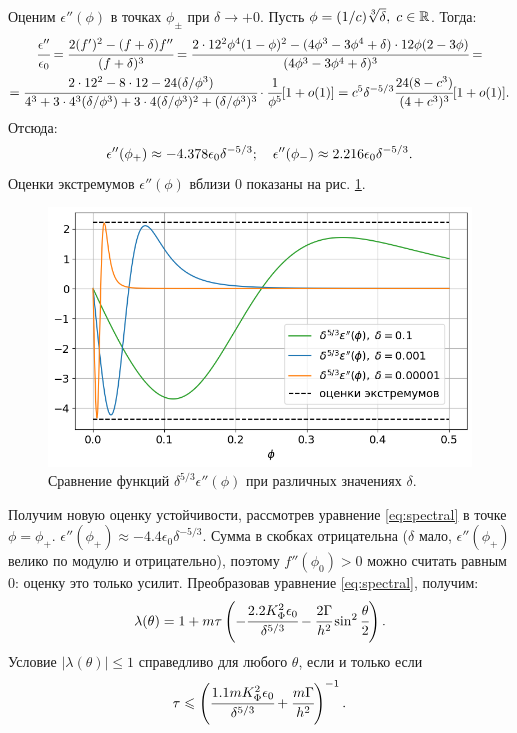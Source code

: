 Оценим $\epsilon''(\phi)$ в точках $\phi_{\pm}$ при $\delta \to +0$. Пусть $\phi = (1/c) \sqrt[3]{\delta}, \; c \in {\mathbb{R}}$. Тогда:
\begin{multline*}
    \cfrac{\epsilon''}{\epsilon_0} = \cfrac{2(f')^2 - (f + \delta)f''}{(f + \delta)^3} = \cfrac{2 \cdot 12^2 \phi^4 (1 - \phi)^2 - (4 \phi^3 - 3 \phi^4 + \delta) \cdot 12 \phi (2 - 3 \phi)}{(4 \phi^3 - 3 \phi^4 + \delta)^3} = \\ = \cfrac{2 \cdot 12^2 - 8 \cdot 12 - 24 (\delta/\phi^3)}{4^3 + 3 \cdot 4^3 (\delta/\phi^3) + 3 \cdot 4 (\delta/\phi^3)^2 + (\delta/\phi^3)^3} \cdot \cfrac{1}{\phi^5}[1 + o(1)] = c^5 \delta^{-5/3} \cfrac{24(8 - c^3)}{(4 + c^3)^3}[1 + o(1)] {\text{.}}
\end{multline*}
Отсюда:
\begin{equation}
    \epsilon''(\phi_+) \approx -4.378 \epsilon_0 \delta^{-5/3}; \quad \epsilon''(\phi_-) \approx 2.216 \epsilon_0 \delta^{-5/3} {\text{.}}
    \label{est:epsilon_phi_phi_bounds}
\end{equation}
Оценки экстремумов $\epsilon''(\phi)$ вблизи $0$ показаны на рис. \ref{fig:eps_phi_phi_multiplied}.

\begin{figure}[!tp]
    \centering
    \includegraphics[width=\textwidth]{figures/eps_phi_phi_multiplied.png}
    \caption{Сравнение функций $\delta^{5/3} \epsilon''(\phi)$ при различных значениях $\delta$.}
    \label{fig:eps_phi_phi_multiplied}
\end{figure}

Получим новую оценку устойчивости, рассмотрев уравнение \eqref{eq:spectral} в точке $\phi = \phi_+$. $\epsilon''(\phi_+) \approx -4.4 \epsilon_0 \delta^{-5/3}$. Сумма в скобках отрицательна ($\delta$ мало, $\epsilon''(\phi_+)$ велико по модулю и отрицательно), поэтому $f''(\phi_0) > 0$ можно считать равным $0$: оценку это только усилит. Преобразовав уравнение \eqref{eq:spectral}, получим:
$$\lambda(\theta) = 1 + m \tau \left( -\cfrac{2.2 K_\Phi^2 \epsilon_0}{\delta^{5/3}} - \cfrac{2 \Gamma}{h^2} \sin^2 \cfrac{\theta}{2} \right) {\text{.}}$$
Условие $|\lambda(\theta)| \leqslant 1$ справедливо для любого $\theta$, если и только если
\begin{equation}
    \tau \leqslant \left( \cfrac{1.1 m K_\Phi^2 \epsilon_0}{\delta^{5/3}} + \cfrac{m \Gamma}{h^2} \right)^{-1} {\text{.}}
    \label{cond:spectral_better_theoretical}
\end{equation}

